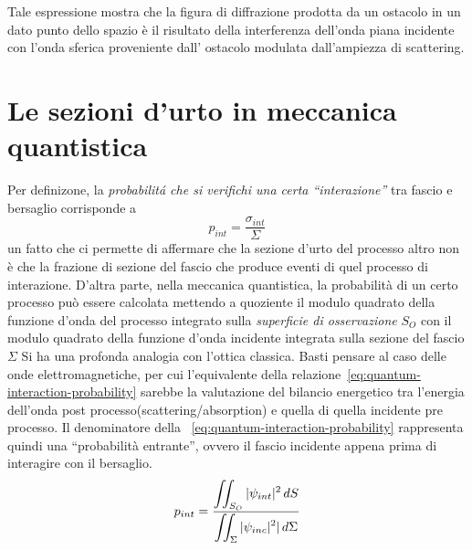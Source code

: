 Tale espressione mostra che la figura di diffrazione prodotta da un ostacolo in un dato punto dello spazio è il
risultato della interferenza dell'onda piana incidente con l'onda sferica proveniente dall' ostacolo modulata
dall'ampiezza di scattering.
\section{Le sezioni d'urto in meccanica quantistica}\label{sec:le-sezioni-d'urto-in-meccanica-quantistica}
Per definizone, la \emph{probabilitá che si verifichi una certa ``interazione''} tra fascio e bersaglio corrisponde a
\[
	 p_{int} = \frac{\sigma_{int}}{\Sigma}
\]
un fatto che ci permette di affermare che la sezione d'urto del
processo altro non è che la frazione di sezione del fascio che produce
eventi di quel processo di interazione.
D'altra parte, nella meccanica quantistica, la
probabilità di un certo processo può essere calcolata mettendo a
quoziente il modulo quadrato della funzione d'onda del processo
integrato sulla \emph{superficie di osservazione} $ S_O$ con il modulo
quadrato della funzione d'onda incidente integrata sulla sezione del
fascio \(\Sigma\)\sidenote
{
Si ha una profonda analogia con l'ottica classica. Basti pensare al caso delle onde elettromagnetiche, per cui l'equivalente
della relazione~\ref{eq:quantum-interaction-probability} sarebbe la valutazione del bilancio energetico
tra l'energia dell'onda post processo(scattering/absorption) e quella di quella incidente pre processo.
Il denominatore della ~\ref{eq:quantum-interaction-probability} rappresenta quindi una ``probabilità entrante'',
ovvero il fascio incidente appena prima di interagire con il bersaglio.
}
\begin{equation}
	p_{int}  = \fraclarg{ \iint_{S_O} |\psi_{int}|^2 \, dS}{\iint_{\Sigma} |\psi_{inc}|^2| \, d \Sigma}
	\label{eq:quantum-interaction-probability}
\end{equation}
